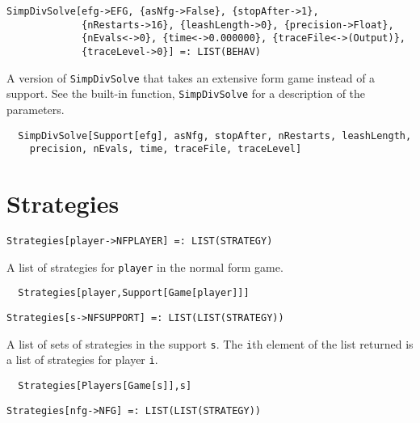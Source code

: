 \newsignature

\begin{verbatim}
SimpDivSolve[efg->EFG, {asNfg->False}, {stopAfter->1}, 
             {nRestarts->16}, {leashLength->0}, {precision->Float}, 
             {nEvals<->0}, {time<->0.000000}, {traceFile<->(Output)}, 
             {traceLevel->0}] =: LIST(BEHAV) 
\end{verbatim}

\noindent
A version of \verb+SimpDivSolve+ that takes an extensive form
game instead of a support.  See the built-in function,
\verb+SimpDivSolve+ for a description of the parameters.

\udfbody
\begin{verbatim}
  SimpDivSolve[Support[efg], asNfg, stopAfter, nRestarts, leashLength,
    precision, nEvals, time, traceFile, traceLevel]
\end{verbatim} 


\section*{Strategies}\label{ExtStrategies}
\begin{verbatim}
Strategies[player->NFPLAYER] =: LIST(STRATEGY) 
\end{verbatim}

\noindent
A list of strategies for \verb+player+ in the normal form game.  

\udfbody
\begin{verbatim}
  Strategies[player,Support[Game[player]]]
\end{verbatim} 

\newsignature

\begin{verbatim}
Strategies[s->NFSUPPORT] =: LIST(LIST(STRATEGY)) 
\end{verbatim}

\noindent
A list of sets of strategies in the support \verb+s+. The \verb+i+th
element of the list returned is a list of strategies for player
\verb+i+. 

\udfbody  
\begin{verbatim}
  Strategies[Players[Game[s]],s]
\end{verbatim} 

\newsignature

\begin{verbatim}
Strategies[nfg->NFG] =: LIST(LIST(STRATEGY)) 
\end{verbatim}

